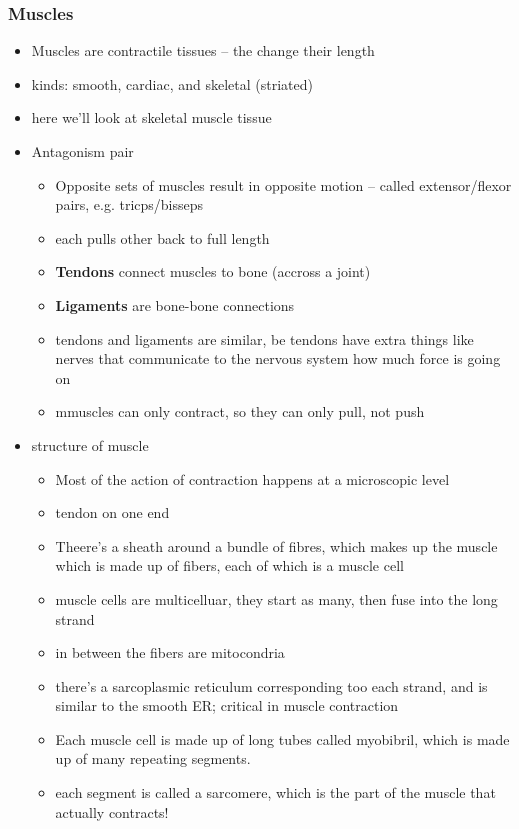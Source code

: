 \documentclass{article}
\theoremstyle{definition}
\begin{document}
\subsubsection{Muscles}
\begin{itemize}
	\item  Muscles are contractile tissues -- the change their length
	\item kinds: smooth, cardiac, and skeletal (striated)
	\item here we'll look at skeletal muscle tissue
	\item Antagonism pair
		\begin{itemize}
			\item Opposite sets of muscles result in opposite motion -- called extensor/flexor pairs, e.g. tricps/bisseps
			\item each pulls other back to full length
			\item \textbf{Tendons}  connect muscles to bone (accross a joint)
			\item \textbf{Ligaments} are bone-bone connections
			\item tendons and ligaments are similar, be tendons have extra things like nerves that communicate to the nervous system how much force is going on
			\item mmuscles can only contract, so they can only pull, not push
		\end{itemize}
	\item structure of muscle
		\begin{itemize}
			\item Most of the  action of contraction happens at a microscopic level
			\item tendon on one end
			\item Theere's a sheath around a bundle of fibres, which makes up the muscle which is made up of fibers, each of which is a muscle cell
			\item muscle cells are multicelluar, they start as many, then fuse into the long strand
			\item in between the fibers are mitocondria
			\item there's a sarcoplasmic reticulum corresponding too each strand, and is similar to the smooth ER; critical in muscle contraction
			\item Each muscle cell is made up of long tubes called myobibril, which is made up of many repeating segments.
			\item each segment is called a sarcomere, which is the part of the muscle that actually contracts!

\end{itemize}
\end{itemize}
\end{document}
